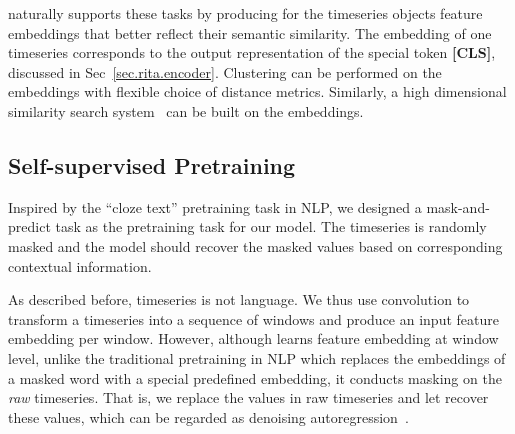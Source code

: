 \begin{sloppypar}
\system naturally supports these tasks by producing for the timeseries objects feature embeddings that better reflect their semantic similarity. The embedding of one timeseries corresponds to the output representation of the special token \textbf{[CLS]}, discussed in Sec~\ref{sec.rita.encoder}.
Clustering can be performed on the embeddings with flexible choice of distance metrics. Similarly, a high dimensional similarity search system~\cite{johnson2019billion, malkov2018efficient, jegou2010product} can be built on the embeddings. 

\vspace{-2mm}
\subsection{Self-supervised Pretraining}
\label{sec.transformer.pretraining}
Inspired by the ``cloze text'' pretraining task in NLP, we designed a mask-and-predict task as the pretraining task for our model. The timeseries is randomly masked and the model should recover the masked values based on corresponding contextual information.

As described before, timeseries is not language. We thus use convolution to transform a timeseries into a sequence of windows and produce an input feature embedding per window. However, although \system learns feature embedding at window level, unlike the traditional pretraining in NLP which replaces the embeddings of a masked word with a special predefined embedding, it conducts masking on the {\it raw} timeseries. That is, we replace the values in raw timeseries and let \system recover these values, which can be regarded as denoising autoregression~\cite{vincent2010stacked}.


\end{sloppypar}

